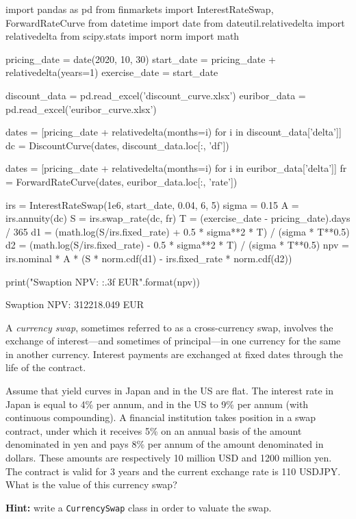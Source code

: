 \cprotEnv\begin{solution}
\begin{ipython}
import pandas as pd
from finmarkets import InterestRateSwap, ForwardRateCurve
from datetime import date
from dateutil.relativedelta import relativedelta
from scipy.stats import norm
import math

pricing_date = date(2020, 10, 30)
start_date = pricing_date + relativedelta(years=1)
exercise_date = start_date

discount_data = pd.read_excel('discount_curve.xlsx')
euribor_data = pd.read_excel('euribor_curve.xlsx')

dates = [pricing_date + relativedelta(months=i) for i in discount_data['delta']]
dc = DiscountCurve(dates, discount_data.loc[:, 'df'])

dates = [pricing_date + relativedelta(months=i) for i in euribor_data['delta']]
fr = ForwardRateCurve(dates, euribor_data.loc[:, 'rate'])


irs = InterestRateSwap(1e6, start_date, 0.04, 6, 5)
sigma = 0.15
A = irs.annuity(dc)
S = irs.swap_rate(dc, fr)
T = (exercise_date - pricing_date).days / 365
d1 = (math.log(S/irs.fixed_rate) + 0.5 * sigma**2 * T) / (sigma * T**0.5)
d2 = (math.log(S/irs.fixed_rate) - 0.5 * sigma**2 * T) / (sigma * T**0.5)
npv = irs.nominal * A * (S * norm.cdf(d1) - irs.fixed_rate * norm.cdf(d2))

print("Swaption NPV: {:.3f} EUR".format(npv))\end{ipython}
\begin{ioutput}
Swaption NPV: 312218.049 EUR
\end{ioutput}
\end{solution}

\begin{question}
A \emph{currency swap}, sometimes referred to as a cross-currency swap, involves the exchange of interest—and sometimes of principal—in one currency for the same in another currency. Interest payments are exchanged at fixed dates through the life of the contract. 

Assume that yield curves in Japan and in the US are flat. The interest rate in Japan is equal to 4\% per annum, and in the US to 9\% per annum (with continuous compounding). A financial institution takes position in a swap contract, under which it receives 5\% on an annual basis of the amount denominated in yen and pays 8\% per annum of the amount denominated in dollars. These amounts are respectively 10 million USD and 1200 million yen. The contract is valid for 3 years and the current exchange rate is 110 USDJPY. What is the value of this currency swap?

\textbf{Hint:} write a \texttt{CurrencySwap} class in order to valuate the swap.
\end{question}

